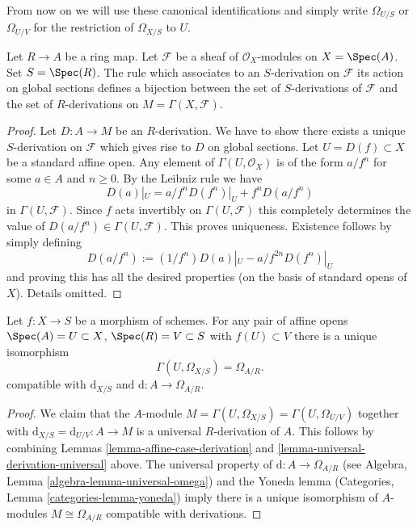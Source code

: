 \noindent
From now on we will use these canonical identifications and simply
write $\Omega_{U/S}$ or $\Omega_{U/V}$ for the restriction of
$\Omega_{X/S}$ to $U$.

\begin{lemma}
\label{lemma-affine-case-derivation}
Let $R \to A$ be a ring map. Let $\mathcal{F}$
be a sheaf of $\mathcal{O}_X$-modules
on $X = \Spec(A)$. Set $S = \Spec(R)$.
The rule which associates to an $S$-derivation on $\mathcal{F}$
its action on global sections defines a bijection between
the set of $S$-derivations of $\mathcal{F}$ and the set of
$R$-derivations on $M = \Gamma(X, \mathcal{F})$.
\end{lemma}

\begin{proof}
Let $D : A \to M$ be an $R$-derivation. We have to show there exists
a unique $S$-derivation on $\mathcal{F}$ which gives rise to
$D$ on global sections. Let $U = D(f) \subset X$ be a standard affine open.
Any element of $\Gamma(U, \mathcal{O}_X)$ is of the form
$a/f^n$ for some $a \in A$ and $n \geq 0$. By the Leibniz rule
we have
$$
D(a)|_U = a/f^n D(f^n)|_U + f^n D(a/f^n)
$$
in $\Gamma(U, \mathcal{F})$. Since $f$ acts invertibly
on $\Gamma(U, \mathcal{F})$ this completely determines
the value of $D(a/f^n) \in \Gamma(U, \mathcal{F})$.
This proves uniqueness. Existence follows by simply defining
$$
D(a/f^n) := (1/f^n) D(a)|_U - a/f^{2n} D(f^n)|_U
$$
and proving this has all the desired properties (on the basis
of standard opens of $X$). Details omitted.
\end{proof}

\begin{lemma}
\label{lemma-differentials-affine}
Let $f : X \to S$ be a morphism of schemes. For any pair of affine opens
$\Spec(A) = U \subset X$, $\Spec(R) = V \subset S$ with $f(U) \subset V$
there is a unique isomorphism
$$
\Gamma(U, \Omega_{X/S}) = \Omega_{A/R}.
$$
compatible with $\text{d}_{X/S}$ and $\text{d} : A \to \Omega_{A/R}$.
\end{lemma}

\begin{proof}
We claim that the $A$-module $M = \Gamma(U, \Omega_{X/S}) =
\Gamma(U, \Omega_{U/V})$ together with
$\text{d}_{X/S} = \text{d}_{U/V} : A \to M$
is a universal $R$-derivation of $A$. This follows by combining
Lemmas \ref{lemma-affine-case-derivation}
and \ref{lemma-universal-derivation-universal} above.
The universal property of
$\text{d} : A \to \Omega_{A/R}$
(see Algebra, Lemma \ref{algebra-lemma-universal-omega})
and the Yoneda lemma
(Categories, Lemma \ref{categories-lemma-yoneda})
imply there is a unique isomorphism of $A$-modules
$M \cong \Omega_{A/R}$ compatible with derivations.
\end{proof}

